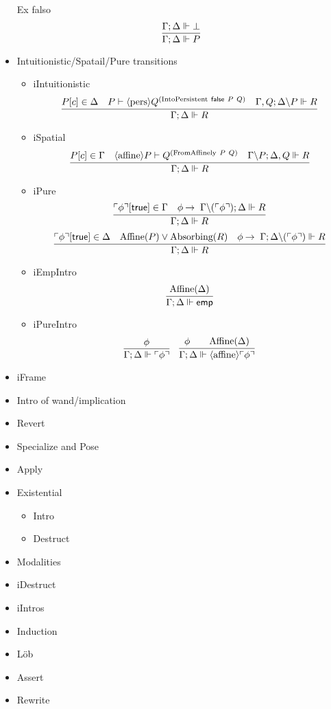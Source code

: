 \begin{itemize}
  Ex falso
  $$
  \infer{\Gamma; \Delta \Vdash P}
        {\Gamma; \Delta \Vdash \bot}
  $$
\item Intuitionistic/Spatail/Pure transitions
  \begin{itemize}
  \item iIntuitionistic
    $$
    \infer{\Gamma ; \Delta \Vdash R}
          {P[c] \in \Delta &
           P \vdash \pers Q^{(\text{IntoPersistent}\ \false\ P\ Q)} &
           \Gamma, Q; \Delta \backslash P \Vdash R
         }
    $$
  \item iSpatial
    $$
    \infer{\Gamma ; \Delta \Vdash R}
          {P[c] \in \Gamma &
           \affine P \vdash Q^{(\text{FromAffinely}\ P\ Q)} &
           \Gamma \backslash P; \Delta, Q \Vdash R
         }
    $$
  \item iPure
    $$
    \infer{\Gamma ; \Delta \Vdash R}
          {\pure{\phi}[\true] \in \Gamma &
           \phi \imp \Gamma \backslash (\pure{\phi}); \Delta \Vdash R
         }
    $$
    $$
    \infer{\Gamma ; \Delta \Vdash R}
          {\pure{\phi}[\true] \in \Delta &
           \Affine{P} \vee \Absorbing{R} &
           \phi \imp \Gamma; \Delta \backslash (\pure{\phi}) \Vdash R
         }
    $$
  \item iEmpIntro
    $$
    \infer{\Gamma ; \Delta \Vdash \emp}
          {\Affine{\Delta}}
    $$
  \item iPureIntro
    \begin{equation}
    \infer{\Gamma ; \Delta \Vdash \pure{\phi}}
          {\phi}
    \quad
    \infer{\Gamma ; \Delta \Vdash \affine \pure{\phi}}
          {\phi & &
           \Affine{\Delta}
          }
    \end{equation}
  \end{itemize}
\item iFrame
\item Intro of wand/implication
\item Revert
\item Specialize and Pose
\item Apply
\item Existential
  \begin{itemize}
  \item Intro
  \item Destruct
  \end{itemize}
\item Modalities
\item iDestruct
\item iIntros
\item Induction
\item Löb
\item Assert
\item Rewrite
\end{itemize}

